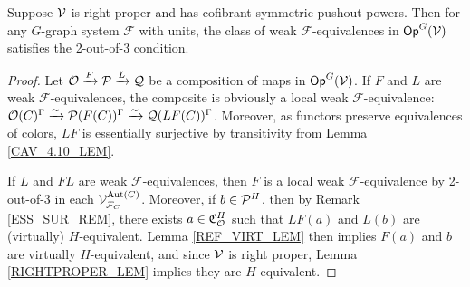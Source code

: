 \documentclass[a4paper,10pt
,draft
]{article}%
\renewcommand{\F}{\mathcal F}
\newcommand{\Q}{\mathcal Q}
\newcommand{\J}{\mathbb J}
\renewcommand{\1}{\eta}%
\begin{document}
\begin{proposition}
      \label{CAV_4.15_PROP}
      \label{2OUTOF3_PROP}
      Suppose $\V$ is right proper and has cofibrant symmetric pushout powers.
      Then for any $G$-graph system $\F$ with units,
      the class of weak $\F$-equivalences in $\mathsf{Op}^G(\V)$ satisfies the 2-out-of-3 condition.
\end{proposition}
\begin{proof}
      Let $\O \xrightarrow{F} \P \xrightarrow{L} \Q$ be a composition of maps in $\mathsf{Op}^G(\V)$.
      If $F$ and $L$ are weak $\F$-equivalences,
      the composite is obviously a local weak $\F$-equivalence:
      $\O(C)^\Gamma \xrightarrow{\sim} \P(F(C))^\Gamma \xrightarrow{\sim} \Q(LF(C))^\Gamma$.
      Moreover, as functors preserve equivalences of colors, $L F$ is essentially surjective by transitivity from Lemma \ref{CAV_4.10_LEM}. 
      
      If $L$ and $FL$ are weak $\F$-equivalences,
      then $F$ is a local weak $\F$-equivalence by 2-out-of-3 in each $\V^{\Aut(C)}_{\F_C}$.
      Moreover, if $b \in \P^H$, then by Remark \ref{ESS_SUR_REM}, there exists $a \in \mathfrak C_\O^H$ such that
      $LF(a)$ and $L(b)$ are (virtually) $H$-equivalent.
      Lemma \ref{REF_VIRT_LEM} then implies $F(a)$ and $b$ are virtually $H$-equivalent, 
      and since $\V$ is right proper, Lemma \ref{RIGHTPROPER_LEM} implies they are $H$-equivalent.


\end{proof}
\end{document}
